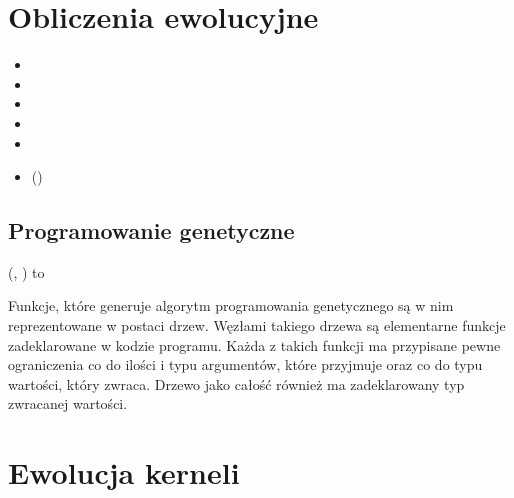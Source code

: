 \section{Obliczenia ewolucyjne}

\begin{itemize}
\item {}
\item {}
\item {}
\item {}
\item {}
\item {} ()
\end{itemize}

\subsection{Programowanie genetyczne}
 (, ) to 

Funkcje, które generuje algorytm programowania genetycznego są w nim reprezentowane w postaci drzew. Węzłami takiego drzewa są elementarne funkcje zadeklarowane w kodzie programu. Każda z takich funkcji ma przypisane pewne ograniczenia co do ilości i typu argumentów, które przyjmuje oraz co do typu wartości, który zwraca. Drzewo jako całość również ma zadeklarowany typ zwracanej wartości.

\section{Ewolucja kerneli}

